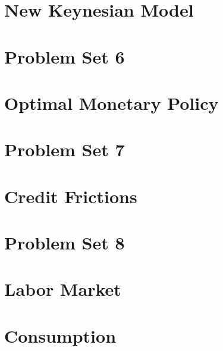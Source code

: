 \documentclass[a4paper, 11pt]{report}
\begin{document}
\chapter{New Keynesian Model}

\chapter{Problem Set 6}

\chapter{Optimal Monetary Policy}

\chapter{Problem Set 7}

\chapter{Credit Frictions}

\chapter{Problem Set 8}

\chapter{Labor Market}

\chapter{Consumption}




\end{document}
